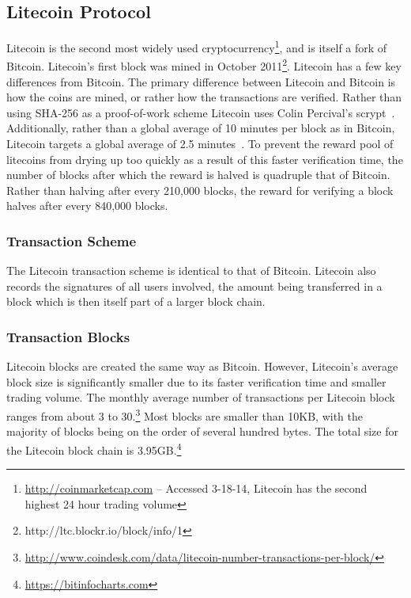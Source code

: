 \documentclass[11pt]{article}
\begin{document}
\subsection{Litecoin Protocol} Litecoin is the second most widely used cryptocurrency\footnote{\url{http://coinmarketcap.com} -- Accessed 3-18-14, Litecoin has the second highest 24 hour
trading volume}, and is itself a fork of Bitcoin. Litecoin's first block was mined in October
2011\footnote{http://ltc.blockr.io/block/info/1}. Litecoin has a few key differences from Bitcoin.  The primary
difference between Litecoin and Bitcoin is how the coins are mined, or rather how the transactions are verified. Rather
than using SHA-256 as a proof-of-work scheme Litecoin uses Colin Percival's scrypt~\cite{percival09}. Additionally,
rather than a global average of 10 minutes per block as in Bitcoin, Litecoin targets a global average of 2.5
minutes~\cite{sprankel13}. To prevent the reward pool of litecoins from drying up too quickly as a result of this faster
verification time, the number of blocks after which the reward is halved is quadruple that of Bitcoin. Rather than
halving after every 210,000 blocks, the reward for verifying a block halves after every 840,000 blocks.

\subsubsection{Transaction Scheme} The Litecoin transaction scheme is identical to that of Bitcoin. Litecoin also
records the signatures of all users involved, the amount being transferred in a block which is then itself part of a
larger block chain.

\subsubsection{Transaction Blocks}
Litecoin blocks are created the same way as Bitcoin. However, Litecoin's average block size is significantly smaller due
to its faster verification time and smaller trading volume. The monthly average number of transactions per Litecoin
block ranges from about 3 to 30.\footnote{\url{http://www.coindesk.com/data/litecoin-number-transactions-per-block/}}
Most blocks are smaller than 10KB, with the majority of blocks being on the order of several hundred bytes. The total
size for the Litecoin block chain is 3.95GB.\footnote{\url{https://bitinfocharts.com}}
\end{document}
